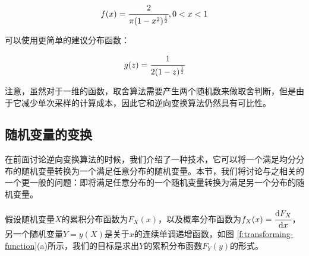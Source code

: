 \begin{equation}
	f(x)= \cfrac{2}{\pi(1-x^2)^{ \frac{1}{2}}},0<x<1
\end{equation}

\noindent 可以使用更简单的建议分布函数：

\begin{equation}
	g(z)= \cfrac{1}{2(1-z)^{ \frac{1}{2}}}
\end{equation}

\noindent 注意，虽然对于一维的函数，取舍算法需要产生两个随机数来做取舍判断，但是由于它减少单次采样的计算成本，因此它和逆向变换算法仍然具有可比性。



\subsection{随机变量的变换}\label{sec:Transformation-of-Random-Variables}
在前面讨论逆向变换算法的时候，我们介绍了一种技术，它可以将一个满足均分分布的随机变量转换为一个满足任意分布的随机变量。本节，我们将讨论与之相关的一个更一般的问题：即将满足任意分布的一个随机变量转换为满足另一个分布的随机变量。

假设随机变量$X$的累积分布函数为$F_X(x)$，以及概率分布函数为$f_X(x)= \cfrac{{\rm d}F_X}{{\rm d}x}$，另一个随机变量$Y=y(X)$是关于$x$的连续单调递增函数，如图 \ref{f:transforming-function}(a)所示，我们的目标是求出$Y$的累积分布函数$F_Y(y)$的形式。

